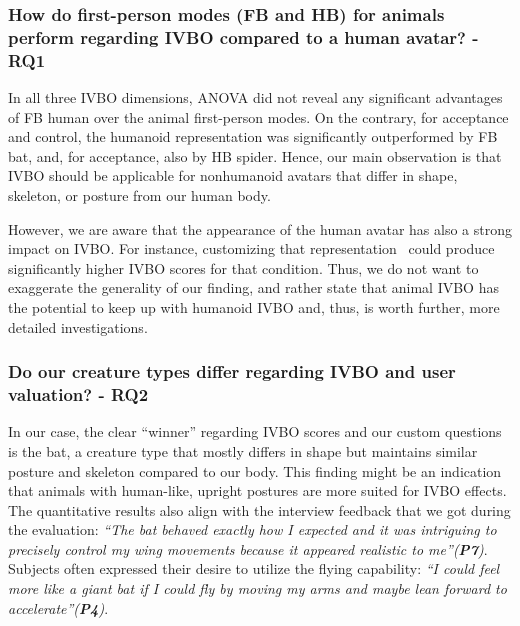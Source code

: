 \documentclass[conference]{IEEEtran}
\begin{document}



\subsubsection{How do first-person modes (FB and HB) for animals perform regarding IVBO compared to a human avatar? - \textbf{RQ1}}
In all three IVBO dimensions, ANOVA did not reveal any significant advantages of FB human over the animal first-person modes. On the contrary, for acceptance and control, the humanoid representation was significantly outperformed by FB bat, and, for acceptance, also by HB spider. Hence, our main observation is that IVBO should be applicable for nonhumanoid avatars that differ in shape, skeleton, or posture from our human body. 

However, we are aware that the appearance of the human avatar has also a strong impact on IVBO. For instance, customizing that representation~\cite{waltemate2018impact} could produce significantly higher IVBO scores for that condition. Thus, we do not want to exaggerate the generality of our finding, and rather state that animal IVBO has the potential to keep up with humanoid IVBO and, thus, is worth further, more detailed investigations.


\subsubsection{Do our creature types differ regarding IVBO and user valuation? - \textbf{RQ2}}

In our case, the clear ``winner'' regarding IVBO scores and our custom questions is the bat, a creature type that mostly differs in shape but maintains similar posture and skeleton compared to our body. This finding might be an indication that animals with human-like, upright postures are more suited for IVBO effects. The quantitative results also align with the interview feedback that we got during the evaluation: \textit{``The bat behaved exactly how I expected and it was intriguing to precisely control my wing movements because it appeared realistic to me''(\textbf{P7})}. Subjects often expressed their desire to utilize the flying capability: \textit{``I could feel more like a giant bat if I could fly by moving my arms and maybe lean forward to accelerate''(\textbf{P4})}.
\end{document}
